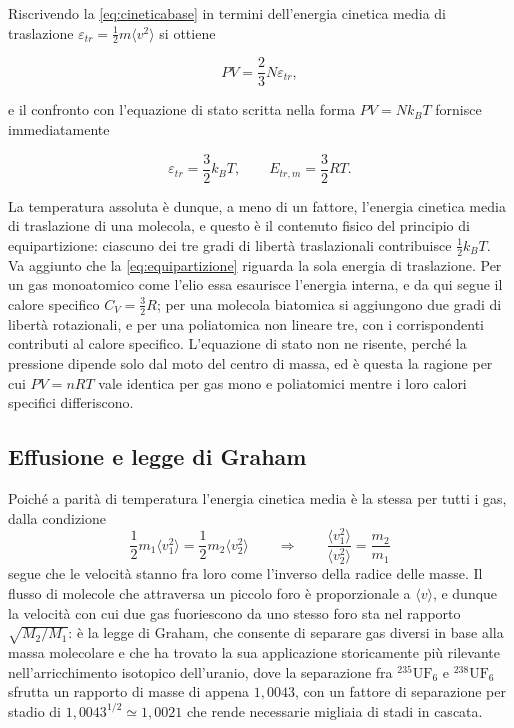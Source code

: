 Riscrivendo la \eqref{eq:cineticabase} in termini dell'energia cinetica media di traslazione $\varepsilon_{tr} = \tfrac{1}{2}m\langle v^2\rangle$ si ottiene

\begin{equation}
    PV = \frac{2}{3}N\varepsilon_{tr},
    \label{eq:pvenergia}
\end{equation}

e il confronto con l'equazione di stato scritta nella forma $PV = Nk_BT$ fornisce immediatamente

\begin{equation}
    \varepsilon_{tr} = \frac{3}{2}k_BT,
    \qquad
    E_{tr,m} = \frac{3}{2}RT .
    \label{eq:equipartizione}
\end{equation}

La temperatura assoluta è dunque, a meno di un fattore, l'energia cinetica media di traslazione di una molecola, e questo è il contenuto fisico del principio di equipartizione: ciascuno dei tre gradi di libertà traslazionali contribuisce $\tfrac{1}{2}k_BT$.\\

Va aggiunto che la \eqref{eq:equipartizione} riguarda la sola energia di traslazione.
Per un gas monoatomico come l'elio essa esaurisce l'energia interna, e da qui segue il calore specifico $C_V = \tfrac{3}{2}R$; per una molecola biatomica si aggiungono due gradi di libertà rotazionali, e per una poliatomica non lineare tre, con i corrispondenti contributi al calore specifico.
L'equazione di stato non ne risente, perché la pressione dipende solo dal moto del centro di massa, ed è questa la ragione per cui $PV = nRT$ vale identica per gas mono e poliatomici mentre i loro calori specifici differiscono.

\subsection{Effusione e legge di Graham}

Poiché a parità di temperatura l'energia cinetica media è la stessa per tutti i gas, dalla condizione
\begin{equation}
    \frac{1}{2}m_1\langle v_1^2\rangle = \frac{1}{2}m_2\langle v_2^2\rangle
    \qquad\Longrightarrow\qquad
    \frac{\langle v_1^2\rangle}{\langle v_2^2\rangle} = \frac{m_2}{m_1}
    \label{eq:graham}
\end{equation}
segue che le velocità stanno fra loro come l'inverso della radice delle masse.
Il flusso di molecole che attraversa un piccolo foro è proporzionale a $\langle v\rangle$, e dunque la velocità con cui due gas fuoriescono da uno stesso foro sta nel rapporto $\sqrt{M_2/M_1}$: è la legge di Graham, che consente di separare gas diversi in base alla massa molecolare e che ha trovato la sua applicazione storicamente più rilevante nell'arricchimento isotopico dell'uranio, dove la separazione fra $^{235}\mathrm{UF_6}$ e $^{238}\mathrm{UF_6}$ sfrutta un rapporto di masse di appena $1,0043$, con un fattore di separazione per stadio di $1,0043^{1/2} \simeq 1,0021$ che rende necessarie migliaia di stadi in cascata.

